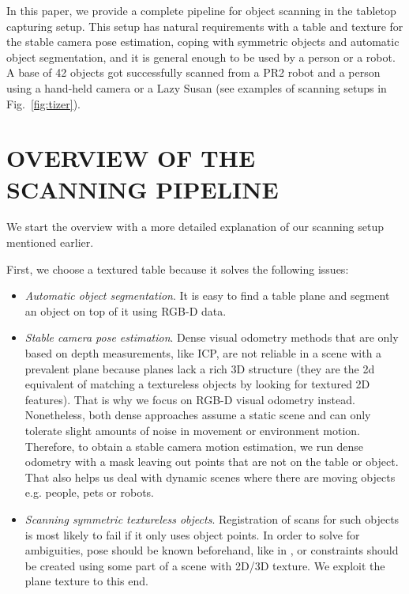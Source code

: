 \documentclass[letterpaper, 10 pt, conference]{ieeeconf}  %
\begin{document}
In this paper, we provide a complete pipeline for object scanning
in the tabletop capturing setup. This setup has natural requirements
with a table and texture for the stable camera pose estimation,
coping with symmetric objects and automatic object segmentation, and it is general enough
to be used by a person or a robot. A base of 42 objects
got successfully scanned from a PR2 robot and a person using a hand-held camera or a Lazy Susan (see 
examples of scanning setups in Fig.~\ref{fig:tizer}).

\section{OVERVIEW OF THE SCANNING PIPELINE}

\label{sec:overview}

We start the overview with a more detailed explanation
of our scanning setup mentioned earlier.

First, we choose a textured table because it solves the following issues:

\begin{itemize}

\item \textit{Automatic object segmentation}. It is easy to find a table plane and segment an object on top of 
it using RGB-D data.
\item \textit{Stable camera pose estimation}. Dense visual odometry methods that are only based on depth measurements,
like ICP, are not reliable in a scene with a prevalent plane \cite{rusinkiewicz2002real}
because planes lack a rich 3D structure (they are the 2d equivalent of matching a textureless objects by 
looking for textured 2D 
features). That is why we focus on RGB-D visual odometry instead. Nonetheless, both dense approaches
assume a static scene and can only tolerate slight amounts of noise in movement or environment motion. Therefore,
to obtain a stable camera motion estimation, we run dense odometry with a mask leaving out points that are not on 
the table or object. That also helps us deal with dynamic scenes where there are moving objects e.g. people, pets or 
robots.
\item \textit{Scanning symmetric textureless objects}. Registration of scans for such objects
is most likely to fail if it only uses object points. In order to solve for ambiguities, pose should be known 
beforehand, like in \cite{krainin2011manipulator},
or constraints should be created using some part of a scene with
2D/3D texture. We exploit the plane texture to this end.
\end{itemize}
\end{document}
